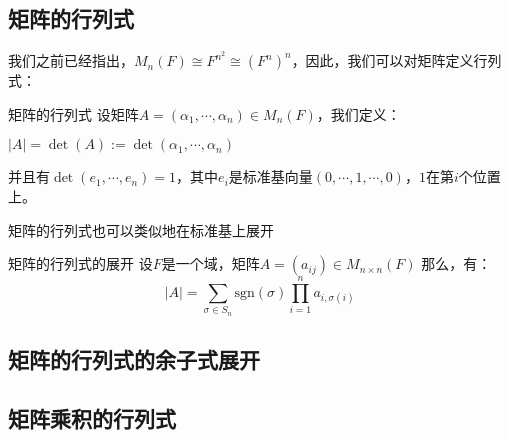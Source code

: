 \documentclass[12pt, a4paper, oneside, UTF8]{ctexbook}
\begin{document}
		\subsection{矩阵的行列式}
			我们之前已经指出，$M_n (F) \cong F^{n^2} \cong (F^n)^n$，因此，我们可以对矩阵定义行列式：
			\begin{defn}{矩阵的行列式}{}
				设矩阵$A = (\alpha_1,\cdots,\alpha_n)\in M_n (F)$，我们定义：

				$|A|=\det (A) := \det(\alpha_1,\cdots,\alpha_n)$

				并且有$\det(e_1,\cdots,e_n)=1$，其中$e_i$是标准基向量$(0,\cdots,1,\cdots,0)$，$1$在第$i$个位置上。
			\end{defn}
			矩阵的行列式也可以类似地在标准基上展开
			\begin{them}{矩阵的行列式的展开}{}
				设$F$是一个域，矩阵$A=(a_{ij}) \in M_{n\times n}(F)$
				那么，有：
				\begin{equation}
					|A|=\sum_{\sigma \in S_n} \text{sgn}(\sigma) \prod_{i=1}^n a_{i,\sigma(i)}
				\end{equation}
			\end{them}
		\subsection{矩阵的行列式的余子式展开}
		\subsection{矩阵乘积的行列式}
\ifx\allfiles\undefined
\end{document}
